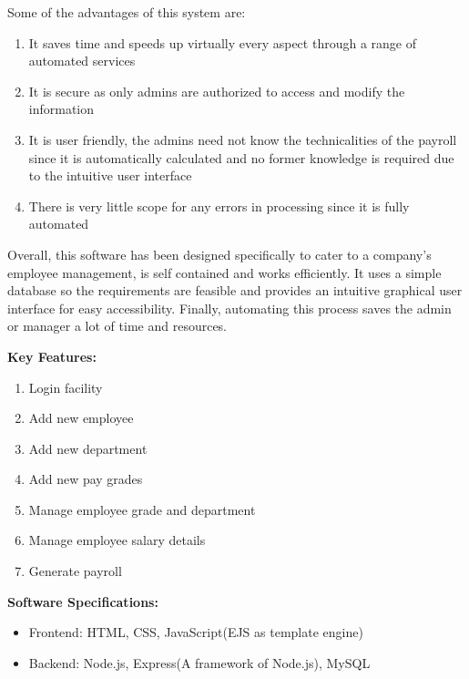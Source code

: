 \documentclass[12pt]{article}
\begin{document}
\newline
\newline
\noindent
Some of the advantages of this system are:
\begin{enumerate}
    \item It saves time and speeds up virtually every aspect through a range of automated services
    \item It is secure as only admins are authorized to access and modify the information
    \item It is user friendly, the admins need not know the technicalities of the payroll since it is automatically calculated and no former knowledge is required due to the intuitive user interface
    \item There is very little scope for any errors in processing since it is fully automated
\end{enumerate}
\noindent
Overall, this software has been designed specifically to cater to a company's employee management, is self contained and works efficiently. It uses a simple database so the requirements are feasible and provides an intuitive graphical user interface for easy accessibility. Finally, automating this process saves the admin or manager a lot of time and resources. 

\noindent
\textbf{Key Features:}
\begin{enumerate}
    \item Login facility
    \item Add new employee
    \item Add new department
    \item Add new pay grades
    \item Manage employee grade and department
    \item Manage employee salary details
    \item Generate payroll
\end{enumerate}
\textbf{Software Specifications:}
\begin{itemize}
    \item Frontend: HTML, CSS, JavaScript(EJS as template engine)
    \item Backend: Node.js, Express(A framework of Node.js), MySQL
\end{itemize}

\newpage                %
\end{document}
